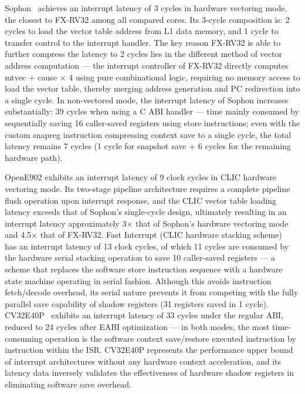 \documentclass[letterpaper,journal]{IEEEtran}
\begin{document}
Sophon~\cite{ref1} achieves an interrupt latency of 3 cycles in hardware vectoring mode, the closest to FX-RV32 among all compared cores.
Its 3-cycle composition is: 2 cycles to load the vector table address from L1 data memory, and 1 cycle to transfer control to the interrupt handler.
The key reason FX-RV32 is able to further compress the latency to 2 cycles lies in the different method of vector address computation — the interrupt controller of FX-RV32 directly computes mtvec + cause × 4 using pure combinational logic, requiring no memory access to load the vector table, thereby merging address generation and PC redirection into a single cycle.
In non-vectored mode, the interrupt latency of Sophon increases substantially: 39 cycles when using a C ABI handler — time mainly consumed by sequentially saving 16 caller-saved registers using store instructions; even with the custom snapreg instruction compressing context save to a single cycle, the total latency remains 7 cycles (1 cycle for snapshot save + 6 cycles for the remaining hardware path).

OpenE902 exhibits an interrupt latency of 9 clock cycles in CLIC hardware vectoring mode.
Its two-stage pipeline architecture requires a complete pipeline flush operation upon interrupt response, and the CLIC vector table loading latency exceeds that of Sophon's single-cycle design, ultimately resulting in an interrupt latency approximately 3× that of Sophon's hardware vectoring mode and 4.5× that of FX-RV32.
Fast Interrupt (CLIC hardware stacking scheme)~\cite{ref5} has an interrupt latency of 13 clock cycles, of which 11 cycles are consumed by the hardware serial stacking operation to save 10 caller-saved registers — a scheme that replaces the software store instruction sequence with a hardware state machine operating in serial fashion.
Although this avoids instruction fetch/decode overhead, its serial nature prevents it from competing with the fully parallel save capability of shadow registers (31 registers saved in 1 cycle).
CV32E40P~\cite{ref6} exhibits an interrupt latency of 33 cycles under the regular ABI, reduced to 24 cycles after EABI optimization — in both modes, the most time-consuming operation is the software context save/restore executed instruction by instruction within the ISR.
CV32E40P represents the performance upper bound of interrupt architectures without any hardware context acceleration, and its latency data inversely validates the effectiveness of hardware shadow registers in eliminating software save overhead.
\end{document}
